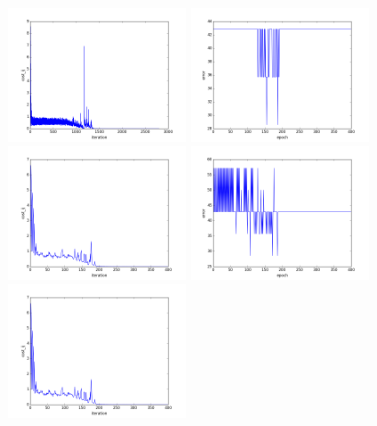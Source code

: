 \begin{figure}[htb]
\centering
\includegraphics[width=0.42\textwidth]{images/redes/ejecucion1/general_svm_mfsd/cost.png}
\includegraphics[width=0.42\textwidth]{images/redes/ejecucion1/general_svm_mfsd/error.png}
\includegraphics[width=0.42\textwidth]{images/redes/ejecucion1/general_svm_mfsd/minidataset/minidatasetcost.png}
\includegraphics[width=0.42\textwidth]{images/redes/ejecucion1/general_svm_mfsd/minidataset/minidataseterror.png}
\includegraphics[width=0.42\textwidth]{images/redes/ejecucion1/general_svm_mfsd/minidataset_tested_itself/cost.png}

\end{figure}
